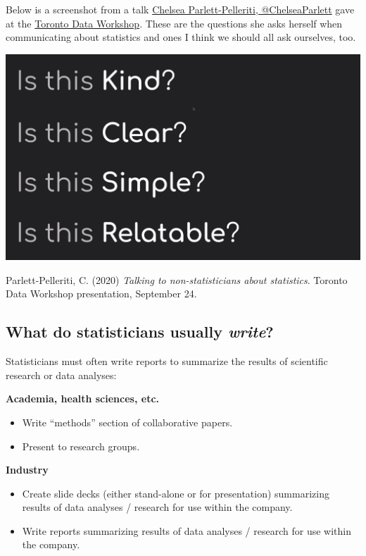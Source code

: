 \documentclass[
  openany]{book}
\providecommand{\tightlist}{%
  \setlength{\itemsep}{0pt}\setlength{\parskip}{0pt}}
\begin{document}
Below is a screenshot from a talk \href{https://twitter.com/ChelseaParlett}{Chelsea Parlett-Pelleriti, @ChelseaParlett} gave at the \href{https://rohanalexander.com/toronto_data_workshop.html}{Toronto Data Workshop}. These are the questions she asks herself when communicating about statistics and ones I think we should all ask ourselves, too.

\begin{center}\includegraphics[width=0.5\linewidth]{images/m2/chelsea} \end{center}

Parlett-Pelleriti, C. (2020) \emph{Talking to non-statisticians about statistics}. Toronto Data Workshop presentation, September 24.

\hypertarget{what-do-statisticians-usually-write}{%
\subsection{\texorpdfstring{What do statisticians usually \emph{write}?}{What do statisticians usually write?}}\label{what-do-statisticians-usually-write}}

Statisticians must often write reports to summarize the results of scientific research or data analyses:

\textbf{Academia, health sciences, etc.}

\begin{itemize}
\tightlist
\item
  Write ``methods'' section of collaborative papers.\\
\item
  Present to research groups.
\end{itemize}

\textbf{Industry}

\begin{itemize}
\tightlist
\item
  Create slide decks (either stand-alone or for presentation) summarizing results of data analyses / research for use within the company.\\
\item
  Write reports summarizing results of data analyses / research for use within the company.
\end{itemize}
\end{document}
